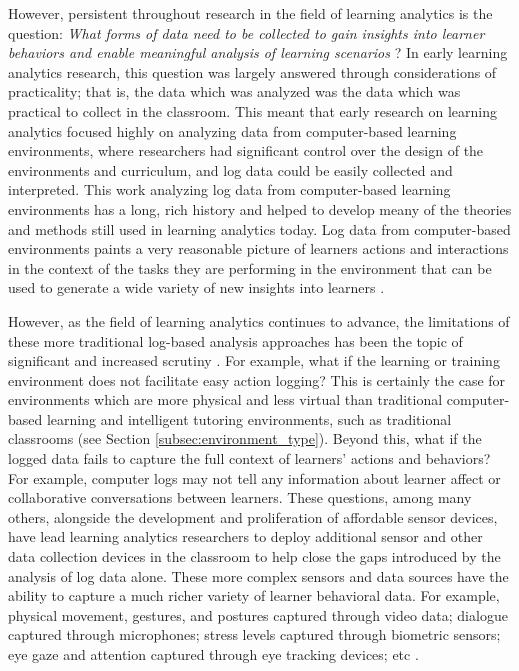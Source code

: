 \documentclass[manuscript,screen,review]{acmart}
\begin{document}
However, persistent throughout research in the field of learning analytics is the question: \textit{What forms of data need to be collected to gain insights into learner behaviors and enable meaningful analysis of learning scenarios} \cite{vatral2022using, ochoa2017multimodal}? In early learning analytics research, this question was largely answered through considerations of practicality; that is, the data which was analyzed was the data which was practical to collect in the classroom. This meant that early research on learning analytics focused highly on analyzing data from computer-based learning environments, where researchers had significant control over the design of the environments and curriculum, and log data could be easily collected and interpreted. This work analyzing log data from computer-based learning environments has a long, rich history and helped to develop meany of the theories and methods still used in learning analytics today. Log data from computer-based environments paints a very reasonable picture of learners actions and interactions in the context of the tasks they are performing in the environment that can be used to generate a wide variety of new insights into learners \cite{hoppe2017computational, ochoa2017multimodal}. 

However, as the field of learning analytics continues to advance, the limitations of these more traditional log-based analysis approaches has been the topic of significant and increased scrutiny \cite{ochoa2017multimodal}. For example, what if the learning or training environment does not facilitate easy action logging? This is certainly the case for environments which are more physical and less virtual than traditional computer-based learning and intelligent tutoring environments, such as traditional classrooms (see Section \ref{subsec:environment_type}). Beyond this, what if the logged data fails to capture the full context of learners' actions and behaviors? For example, computer logs may not tell any information about learner affect or collaborative conversations between learners. These questions, among many others, alongside the development and proliferation of affordable sensor devices, have lead learning analytics researchers to deploy additional sensor and other data collection devices in the classroom to help close the gaps introduced by the analysis of log data alone. These more complex sensors and data sources have the ability to capture a much richer variety of learner behavioral data. For example, physical movement, gestures, and postures captured through video data; dialogue captured through microphones; stress levels captured through biometric sensors; eye gaze and attention captured through eye tracking devices; etc \cite{vatral2022using}. 
\end{document}
